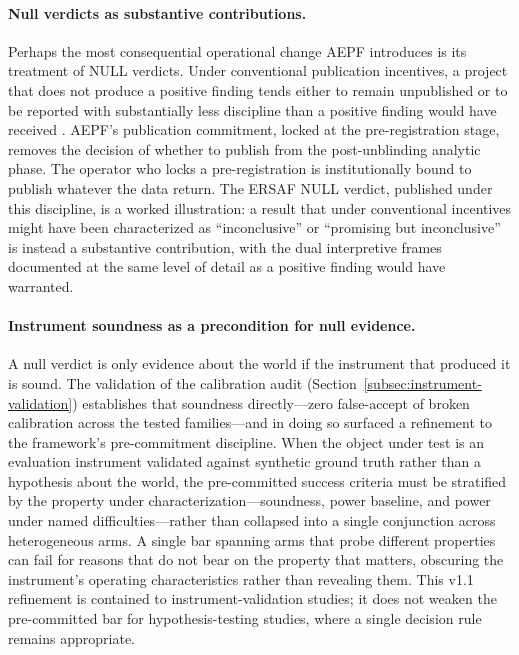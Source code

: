 \documentclass[11pt]{article}
\begin{document}
\paragraph{Null verdicts as substantive contributions.}
Perhaps the most consequential operational change AEPF introduces is
its treatment of NULL verdicts. Under conventional publication
incentives, a project that does not produce a positive finding tends
either to remain unpublished or to be reported with substantially
less discipline than a positive finding would have received
\cite{ioannidis2005, nosek2015open}. AEPF's publication commitment,
locked at the pre-registration stage, removes the decision of whether
to publish from the post-unblinding analytic phase. The operator who
locks a pre-registration is institutionally bound to publish whatever
the data return. The ERSAF NULL verdict, published under this
discipline, is a worked illustration: a result that under conventional
incentives might have been characterized as ``inconclusive'' or
``promising but inconclusive'' is instead a substantive contribution,
with the dual interpretive frames documented at the same level of
detail as a positive finding would have warranted.

\paragraph{Instrument soundness as a precondition for null evidence.}
A null verdict is only evidence about the world if the instrument
that produced it is sound. The validation of the calibration audit
(Section~\ref{subsec:instrument-validation}) establishes that
soundness directly---zero false-accept of broken calibration across
the tested families---and in doing so surfaced a refinement to the
framework's pre-commitment discipline. When the object under test is
an evaluation instrument validated against synthetic ground truth
rather than a hypothesis about the world, the pre-committed success
criteria must be stratified by the property under
characterization---soundness, power baseline, and power under named
difficulties---rather than collapsed into a single conjunction across
heterogeneous arms. A single bar spanning arms that probe different
properties can fail for reasons that do not bear on the property that
matters, obscuring the instrument's operating characteristics rather
than revealing them. This v1.1 refinement is contained to
instrument-validation studies; it does not weaken the pre-committed
bar for hypothesis-testing studies, where a single decision rule
remains appropriate.
\end{document}
